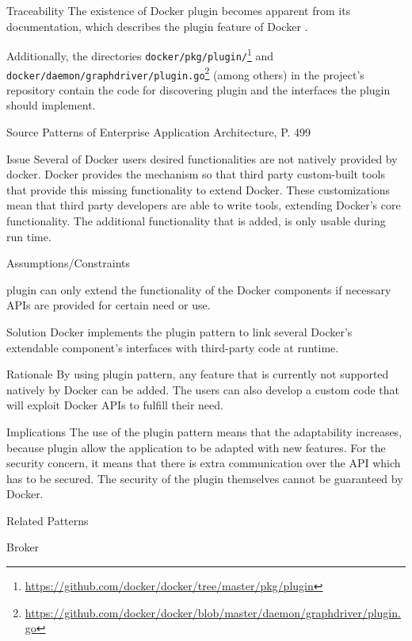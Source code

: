 \begin{patdescription}

\item [Traceability]
The existence of Docker plugin becomes apparent from its documentation, which
describes the plugin feature of Docker \cite{dockerplugindocs}.

Additionally, the directories \verb|docker/pkg/plugin/|\footnote{\url{https://github.com/docker/docker/tree/master/pkg/plugin}} and
\verb|docker/daemon/graphdriver/plugin.go|\footnote{
\url{https://github.com/docker/docker/blob/master/daemon/graphdriver/plugin.go}}
(among others) in the project's repository contain the code for discovering
plugin and the interfaces the plugin should implement.

\item [Source]
Patterns of Enterprise Application Architecture, P. 499 \cite{eaa}

\item [Issue]
Several of Docker users desired functionalities are not natively provided by
docker. Docker provides the mechanism so that third party custom-built tools
that provide this missing functionality to extend Docker. These customizations
mean that third party developers are able to write tools, extending Docker's
core functionality\cite{dockerpluginblog}. The additional functionality that is
added, is only usable during run time.


\item [Assumptions/Constraints]
\begin{mynesteditemlist}
\item plugin can only extend the functionality of the Docker components if
necessary APIs are provided for certain need or use.
\end{mynesteditemlist}

\item [Solution]
Docker implements the plugin pattern to link several Docker's extendable component's interfaces with third-party code at runtime.

\item [Rationale]  %
By using plugin pattern, any feature that is currently not supported natively
by Docker can be added. The users can also develop a custom code that will
exploit Docker APIs to fulfill their need.

\item [Implications]
The use of the plugin pattern means that the adaptability increases, because
plugin allow the application to be adapted with new features. For the security
concern, it means that there is extra communication over the API which has to be
secured. The security of the plugin themselves cannot be guaranteed by Docker.

\item [Related Patterns]
\begin{mynesteditemlist}
\item Broker
\end{mynesteditemlist}
\end{patdescription}

